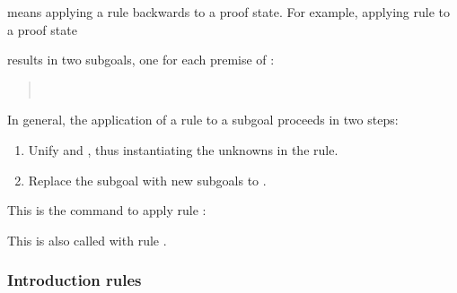 \begin{isabellebody}
\begin{isamarkuptext}
 means applying a rule backwards to a proof state.
For example, applying rule  to a proof state
\begin{quote}
\end{quote}
results in two subgoals, one for each premise of :
\begin{quote}
\\
\end{quote}
In general, the application of a rule 
to a subgoal \mbox{} proceeds in two steps:
\begin{enumerate}
\item
Unify  and , thus instantiating the unknowns in the rule.
\item
Replace the subgoal  with  new subgoals  to .
\end{enumerate}
This is the command to apply rule :
\begin{quote}
\end{quote}
This is also called  with rule .

\subsubsection{Introduction rules}


\end{isamarkuptext}
\end{isabellebody}
